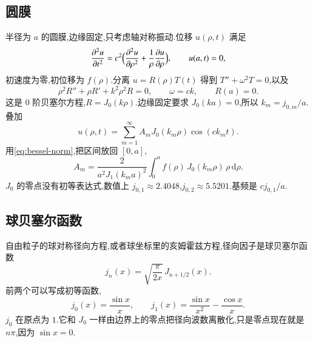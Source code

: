 \subsection{圆膜}
半径为 $a$ 的圆膜,边缘固定,只考虑轴对称振动.位移 $u(\rho,t)$ 满足
\begin{equation}
  \frac{\partial^2 u}{\partial t^2}
  =c^2\Bigl(\frac{\partial^2 u}{\partial\rho^2}+\frac{1}{\rho}\frac{\partial u}{\partial\rho}\Bigr),
  \qquad
  u(a,t)=0,
\end{equation}
初速度为零,初位移为 $f(\rho)$.分离 $u=R(\rho)T(t)$ 得到 $T''+\omega^2 T=0$,以及
\begin{equation}
  \rho^2 R''+\rho R'+k^2\rho^2 R=0,
  \qquad \omega=ck,\qquad R(a)=0.
\end{equation}
这是 $0$ 阶贝塞尔方程,$R=J_0(k\rho)$.边缘固定要求 $J_0(ka)=0$,所以 $k_m=j_{0,m}/a$.叠加
\begin{equation}
  u(\rho,t)=\sum_{m=1}^{\infty} A_m J_0(k_m\rho)\cos(c k_m t).
\end{equation}
用\eqref{eq:bessel-norm},把区间放回 $[0,a]$,
\begin{equation}
  A_m
  =\frac{2}{a^2 J_1(k_m a)^2}
    \int_0^a f(\rho)\, J_0(k_m\rho)\, \rho\,\mathrm{d}\rho.
\end{equation}
$J_0$ 的零点没有初等表达式,数值上 $j_{0,1}\approx 2.4048$,$j_{0,2}\approx 5.5201$.基频是 $c j_{0,1}/a$.

\subsection{球贝塞尔函数}
自由粒子的球对称径向方程,或者球坐标里的亥姆霍兹方程,径向因子是球贝塞尔函数
\begin{equation}
  j_n(x)=\sqrt{\frac{\pi}{2x}}\, J_{n+1/2}(x).
\end{equation}
前两个可以写成初等函数,
\begin{equation}
  j_0(x)=\frac{\sin x}{x},
  \qquad
  j_1(x)=\frac{\sin x}{x^2}-\frac{\cos x}{x}.
\end{equation}
$j_0$ 在原点为 $1$.它和 $J_0$ 一样由边界上的零点把径向波数离散化,只是零点现在就是 $n\pi$,因为 $\sin x=0$.
